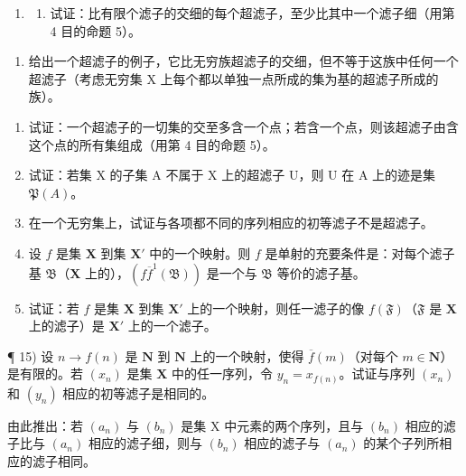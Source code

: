 \begin{enumerate}
\def\labelenumi{\arabic{enumi})}
\setcounter{enumi}{8}
\tightlist
\item
  \begin{enumerate}
  \def\labelenumii{\alph{enumii})}
  \tightlist
  \item
    试证：比有限个滤子的交细的每个超滤子，至少比其中一个滤子细（用第 4 目的命题 5）。
  \end{enumerate}
\end{enumerate}

\begin{enumerate}
\def\labelenumi{\alph{enumi})}
\setcounter{enumi}{1}
\tightlist
\item
  给出一个超滤子的例子，它比无穷族超滤子的交细，但不等于这族中任何一个超滤子（考虑无穷集 X 上每个都以单独一点所成的集为基的超滤子所成的族）。
\end{enumerate}

\begin{enumerate}
\def\labelenumi{\arabic{enumi})}
\setcounter{enumi}{9}
\item
  试证：一个超滤子的一切集的交至多含一个点；若含一个点，则该超滤子由含这个点的所有集组成（用第 4 目的命题 5）。
\item
  试证：若集 X 的子集 A 不属于 X 上的超滤子 U，则 U 在 A 上的迹是集 \(\mathfrak{P}(A)\)。
\item
  在一个无穷集上，试证与各项都不同的序列相应的初等滤子不是超滤子。
\item
  设 \(f\) 是集 \(\mathbf{X}\) 到集 \(\mathbf{X}'\) 中的一个映射。则 \(f\) 是单射的充要条件是：对每个滤子基 \(\mathfrak{B}\)（\(\mathbf{X}\) 上的），\((f\overline{f}^{1}(\mathfrak{B}))\) 是一个与 \(\mathfrak{B}\) 等价的滤子基。
\item
  试证：若 \(f\) 是集 \(\mathbf{X}\) 到集 \(\mathbf{X}'\) 上的一个映射，则任一滤子的像 \(f(\mathfrak{F})\)（\(\mathfrak{F}\) 是 \(\mathbf{X}\) 上的滤子）是 \(\mathbf{X}'\) 上的一个滤子。
\end{enumerate}

¶ 15) 设 \(n \to f(n)\) 是 \(\mathbf{N}\) 到 \(\mathbf{N}\) 上的一个映射，使得 \(\overline{f}(m)\)（对每个 \(m \in \mathbf{N}\)）是有限的。若 \((x_n)\) 是集 \(\mathbf{X}\) 中的任一序列，令 \(y_n = x_{f(n)}\)。试证与序列 \((x_n)\) 和 \((y_n)\) 相应的初等滤子是相同的。

由此推出：若 \((a_{n})\) 与 \((b_{n})\) 是集 X 中元素的两个序列，且与 \((b_{n})\) 相应的滤子比与 \((a_{n})\) 相应的滤子细，则与 \((b_{n})\) 相应的滤子与 \((a_{n})\) 的某个子列所相应的滤子相同。

